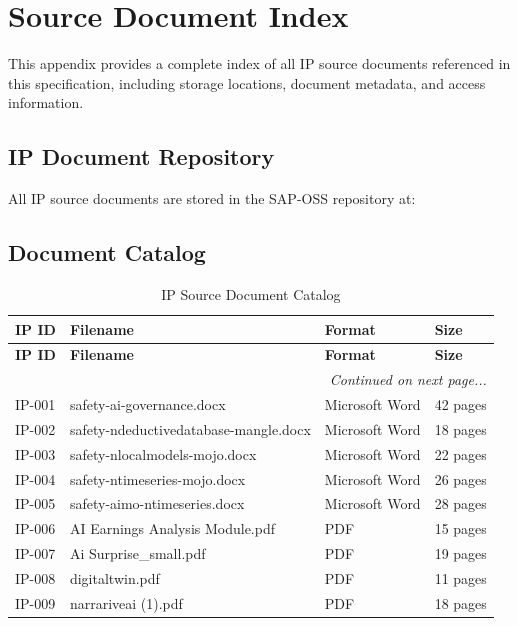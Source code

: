 
\chapter{Source Document Index}
\label{chap:source-document-index}

This appendix provides a complete index of all IP source documents referenced in this specification, including storage locations, document metadata, and access information.

\section{IP Document Repository}

All IP source documents are stored in the SAP-OSS repository at:

\begin{center}
\end{center}

\section{Document Catalog}

\begin{longtable}{@{}p{1.2cm}p{5cm}p{3cm}p{3cm}@{}}
\toprule
\textbf{IP ID} & \textbf{Filename} & \textbf{Format} & \textbf{Size} \\
\midrule
\endfirsthead
\toprule
\textbf{IP ID} & \textbf{Filename} & \textbf{Format} & \textbf{Size} \\
\midrule
\endhead
\midrule
\multicolumn{4}{r}{\textit{Continued on next page...}} \\
\endfoot
\bottomrule
\caption{IP Source Document Catalog}
\label{tab:document-catalog}
\endlastfoot

IP-001 & safety-ai-governance.docx & Microsoft Word & 42 pages \\
IP-002 & safety-ndeductivedatabase-mangle.docx & Microsoft Word & 18 pages \\
IP-003 & safety-nlocalmodels-mojo.docx & Microsoft Word & 22 pages \\
IP-004 & safety-ntimeseries-mojo.docx & Microsoft Word & 26 pages \\
IP-005 & safety-aimo-ntimeseries.docx & Microsoft Word & 28 pages \\
IP-006 & AI Earnings Analysis Module.pdf & PDF & 15 pages \\
IP-007 & Ai Surprise\_small.pdf & PDF & 19 pages \\
IP-008 & digitaltwin.pdf & PDF & 11 pages \\
IP-009 & narrariveai (1).pdf & PDF & 18 pages \\

\end{longtable}

